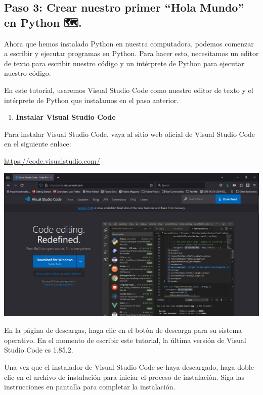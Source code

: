 \documentclass[
  a4paper,
  DIV=11,
  numbers=noendperiod,
  onepage,
  openany]{scrreprt}
\providecommand{\tightlist}{%
  \setlength{\itemsep}{0pt}\setlength{\parskip}{0pt}}\usepackage{longtable,booktabs,array}
\begin{document}
\subsection{Paso 3: Crear nuestro primer ``Hola Mundo'' en Python
🗺️.}\label{paso-3-crear-nuestro-primer-hola-mundo-en-python-.}

Ahora que hemos instalado Python en nuestra computadora, podemos
comenzar a escribir y ejecutar programas en Python. Para hacer esto,
necesitamos un editor de texto para escribir nuestro código y un
intérprete de Python para ejecutar nuestro código.

En este tutorial, usaremos Visual Studio Code como nuestro editor de
texto y el intérprete de Python que instalamos en el paso anterior.

\begin{enumerate}
\def\labelenumi{\arabic{enumi}.}
\tightlist
\item
  \textbf{Instalar Visual Studio Code}
\end{enumerate}

Para instalar Visual Studio Code, vaya al sitio web oficial de Visual
Studio Code en el siguiente enlace:

\url{https://code.visualstudio.com/}

\includegraphics{unidades/unidad2/images/paste-6.png}

En la página de descargas, haga clic en el botón de descarga para su
sistema operativo. En el momento de escribir este tutorial, la última
versión de Visual Studio Code es 1.85.2.

Una vez que el instalador de Visual Studio Code se haya descargado, haga
doble clic en el archivo de instalación para iniciar el proceso de
instalación. Siga las instrucciones en pantalla para completar la
instalación.
\end{document}
